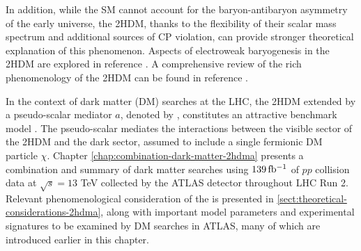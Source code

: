 In addition, while the SM cannot account for the baryon-antibaryon asymmetry of the early universe, the 2HDM, thanks to the flexibility of their scalar mass spectrum and additional sources of CP violation, can provide stronger theoretical explanation of this phenomenon. 
Aspects of electroweak baryogenesis in the 2HDM are explored in reference \cite{Joyce_1996, Funakubo_1994, Cline_1996, PhysRevD.55.3873, LAINE200123, LarsFromme_2006}. 
A comprehensive review of the rich phenomenology of the 2HDM can be found in reference \cite{Branco_2012}.

In the context of dark matter (DM) searches at the LHC, the 2HDM extended by a pseudo-scalar mediator $a$, denoted by \thdma, constitutes an attractive benchmark model \cite{2HDMWGproxi}. 
The pseudo-scalar mediates the interactions between the visible sector of the 2HDM and the dark sector, assumed to include a single fermionic DM particle $\chi$. 
Chapter \ref{chap:combination-dark-matter-2hdma} presents a combination and summary of dark matter searches using $139\, \mbox{fb\(^{-1}\)}$ of $pp$ collision data at $\sqrt{s}=13$ TeV collected by the ATLAS detector throughout LHC Run 2. 
Relevant phenomenological consideration of the \thdma is presented in \ref{sect:theoretical-considerations-2hdma}, along with important model parameters and experimental signatures to be examined by DM searches in ATLAS, many of which are introduced earlier in this chapter. 